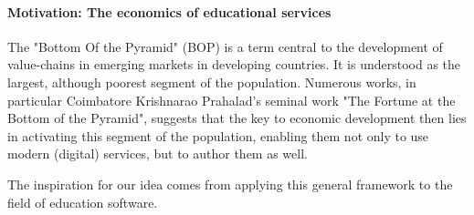 \paragraph{Motivation: The economics of educational services}

The "Bottom Of the Pyramid" (BOP) is a term central to the development of
value-chains in emerging markets in developing countries. It is understood as
the largest, although poorest segment of the population. Numerous works, in
particular Coimbatore Krishnarao Prahalad's seminal work "The Fortune at the
Bottom of the Pyramid", suggests that the key to economic development then lies
in activating this segment of the population, enabling them not only to use
modern (digital) services, but to author them as 
well\cite{prahalad2009fortune}.

The inspiration for our idea comes from applying this general framework to the
field of education software.
